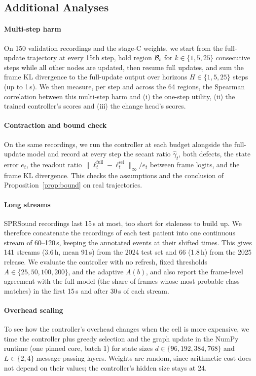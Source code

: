 \subsection{Additional Analyses}
\label{sec:analyses}
\paragraph*{Multi-step harm} On 150 validation recordings and the stage-C weights, we start from the full-update trajectory at every 15th step, hold region $\mathcal{B}_i$ for $k\in\{1,5,25\}$ consecutive steps while all other nodes are updated, then resume full updates, and sum the frame KL divergence to the full-update output over horizons $H\in\{1,5,25\}$ steps (up to 1\,s). We then measure, per step and across the 64 regions, the Spearman correlation between this multi-step harm and (i) the one-step utility, (ii) the trained controller's scores and (iii) the change head's scores.

\paragraph*{Contraction and bound check} On the same recordings, we run the controller at each budget alongside the full-update model and record at every step the secant ratio $\hat\gamma_t$, both defects, the state error $e_t$, the readout ratio $\|\ell^{\mathrm{full}}_t-\ell^{\mathrm{sel}}_t\|_\infty/e_t$ between frame logits, and the frame KL divergence. This checks the assumptions and the conclusion of Proposition~\ref{prop:bound} on real trajectories.

\paragraph*{Long streams} SPRSound recordings last 15\,s at most, too short for staleness to build up. We therefore concatenate the recordings of each test patient into one continuous stream of 60--120\,s, keeping the annotated events at their shifted times. This gives 141 streams (3.6\,h, mean 91\,s) from the 2024 test set and 66 (1.8\,h) from the 2025 release. We evaluate the controller with no refresh, fixed thresholds $A\in\{25,50,100,200\}$, and the adaptive $A(b)$, and also report the frame-level agreement with the full model (the share of frames whose most probable class matches) in the first 15\,s and after 30\,s of each stream.

\paragraph*{Overhead scaling} To see how the controller's overhead changes when the cell is more expensive, we time the controller plus greedy selection and the graph update in the NumPy runtime (one pinned core, batch 1) for state sizes $d\in\{96,192,384,768\}$ and $L\in\{2,4\}$ message-passing layers. Weights are random, since arithmetic cost does not depend on their values; the controller's hidden size stays at 24.

